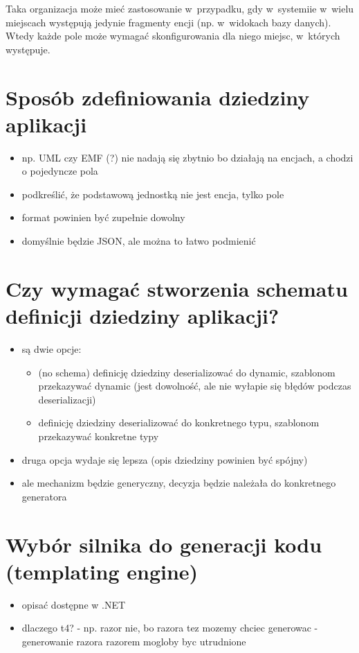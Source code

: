 

Taka organizacja może mieć zastosowanie w~przypadku, gdy w~systemiie w~wielu miejscach występują jedynie fragmenty encji (np. w~widokach bazy danych).
Wtedy każde pole może wymagać skonfigurowania dla niego miejsc, w~których występuje.



\section{Sposób zdefiniowania dziedziny aplikacji} \label{sec:core:domain_definition}

\begin{itemize}
 \item np. UML czy EMF (?) nie nadają się zbytnio bo działają na encjach, a chodzi o pojedyncze pola
 \item podkreślić, że podstawową jednostką nie jest encja, tylko pole
 \item format powinien być zupełnie dowolny
 \item domyślnie będzie JSON, ale można to łatwo podmienić
\end{itemize}



\section{Czy wymagać stworzenia schematu definicji dziedziny aplikacji?} \label{sec:core:domain_schema_requirement}

\begin{itemize}
 \item są dwie opcje:
  \begin{itemize}
   \item (no schema) definicję dziedziny deserializować do dynamic, szablonom przekazywać dynamic (jest dowolność, ale nie wyłapie się błędów podczas deserializacji)
   \item definicję dziedziny deserializować do konkretnego typu, szablonom przekazywać konkretne typy
  \end{itemize}
 \item druga opcja wydaje się lepsza (opis dziedziny powinien być spójny)
 \item ale mechanizm będzie generyczny, decyzja będzie należała do konkretnego generatora
\end{itemize}



\section{Wybór silnika do generacji kodu (templating engine)} \label{sec:core:templating_engine}

\begin{itemize}
 \item opisać dostępne w .NET
 \item dlaczego t4? - np. razor nie, bo razora tez mozemy chciec generowac - generowanie razora razorem mogloby byc utrudnione
\end{itemize}
